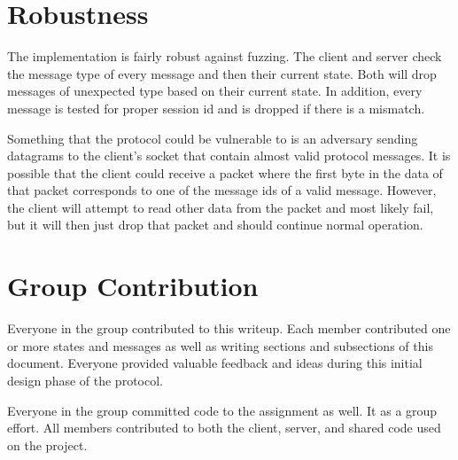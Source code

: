 \documentclass[12pt,letterpaper,titlepage]{article}
\begin{document}
\section{Robustness}
The implementation is fairly robust against fuzzing. The client and server check the message
type of every message and then their current state. Both will drop messages of unexpected type based on their current state. In addition, every message is tested for proper session id and is
dropped if there is a mismatch.

Something that the protocol could be vulnerable to is an adversary sending datagrams to
the client's socket that contain almost valid protocol messages. It is possible that the client
could receive a packet where the first byte in the data of that packet corresponds to one of the
message ids of a valid message. However, the client will attempt to read other data from the packet
and most likely fail, but it will then just drop that packet and should continue normal operation.

\section{Group Contribution}
Everyone in the group contributed to this writeup. Each member contributed one or more states and messages as well as writing sections and subsections of this document. Everyone provided valuable feedback and ideas during this initial design phase of the protocol.


Everyone in the group committed code to the assignment as well. It as a group effort. All members
contributed to both the client, server, and shared code used on the project.
\end{document}
